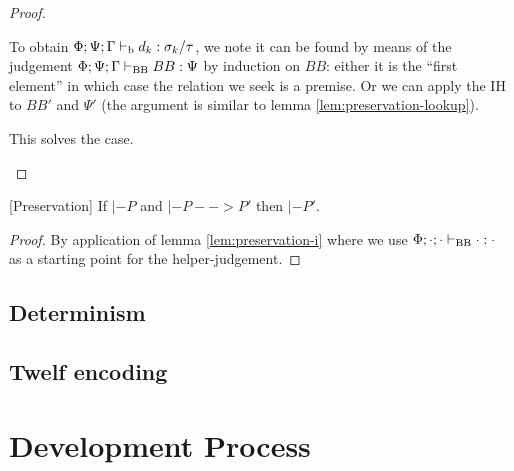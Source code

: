 \documentclass[a4paper, oneside, 10pt, draft]{memoir}
\begin{document}
\begin{proof}
\begin{itemize}
    To obtain $\Phi;\Psi;\Gamma |-_{\mathrm{b}} d_k : \sigma_k / \tau$, we note
    it can be found by means of the judgement $\Phi;\Psi;\Gamma |-_{\mathrm{BB}}
    BB : \Psi$ by induction on $BB$: either it is the ``first
    element'' in which case the relation we seek is a premise. Or we
    can apply the IH to $BB'$ and $\Psi'$ (the argument is similar to
    lemma \ref{lem:preservation-lookup}).

    This solves the case.
  \end{itemize}
\end{proof}

\begin{thm}{[Preservation]}
  \label{thm:preservation}
  If $|- P$ and $|- P --> P'$ then $|- P'$.
\end{thm}
\begin{proof}
  By application of lemma \ref{lem:preservation-i} where we use
  $\Phi;\cdot;\cdot |-_{\mathrm{BB}} \cdot : \cdot$ as a starting point for the
  helper-judgement.
\end{proof}
\section{Determinism}

\section{Twelf encoding}

\chapter{Development Process}
\end{document}

